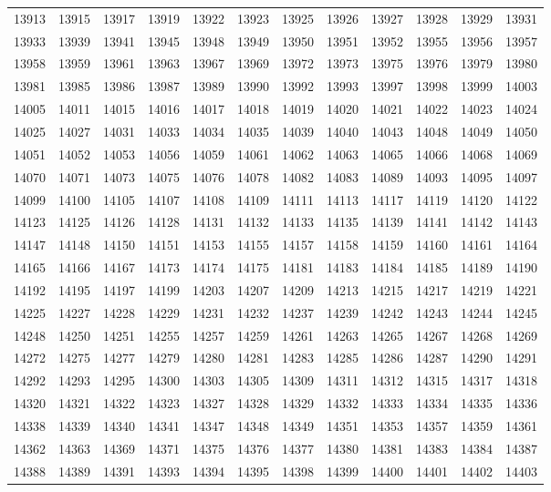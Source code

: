 \begin{center}
\begin{longtable}{llllllllllll}
13913 &13915 &13917 &13919 &13922 &13923 &13925 &13926 &13927 &13928 &13929 &13931 \\
13933 &13939 &13941 &13945 &13948 &13949 &13950 &13951 &13952 &13955 &13956 &13957 \\
13958 &13959 &13961 &13963 &13967 &13969 &13972 &13973 &13975 &13976 &13979 &13980 \\
13981 &13985 &13986 &13987 &13989 &13990 &13992 &13993 &13997 &13998 &13999 &14003 \\
14005 &14011 &14015 &14016 &14017 &14018 &14019 &14020 &14021 &14022 &14023 &14024 \\
14025 &14027 &14031 &14033 &14034 &14035 &14039 &14040 &14043 &14048 &14049 &14050 \\
14051 &14052 &14053 &14056 &14059 &14061 &14062 &14063 &14065 &14066 &14068 &14069 \\
14070 &14071 &14073 &14075 &14076 &14078 &14082 &14083 &14089 &14093 &14095 &14097 \\
14099 &14100 &14105 &14107 &14108 &14109 &14111 &14113 &14117 &14119 &14120 &14122 \\
14123 &14125 &14126 &14128 &14131 &14132 &14133 &14135 &14139 &14141 &14142 &14143 \\
14147 &14148 &14150 &14151 &14153 &14155 &14157 &14158 &14159 &14160 &14161 &14164 \\
14165 &14166 &14167 &14173 &14174 &14175 &14181 &14183 &14184 &14185 &14189 &14190 \\
14192 &14195 &14197 &14199 &14203 &14207 &14209 &14213 &14215 &14217 &14219 &14221 \\
14225 &14227 &14228 &14229 &14231 &14232 &14237 &14239 &14242 &14243 &14244 &14245 \\
14248 &14250 &14251 &14255 &14257 &14259 &14261 &14263 &14265 &14267 &14268 &14269 \\
14272 &14275 &14277 &14279 &14280 &14281 &14283 &14285 &14286 &14287 &14290 &14291 \\
14292 &14293 &14295 &14300 &14303 &14305 &14309 &14311 &14312 &14315 &14317 &14318 \\
14320 &14321 &14322 &14323 &14327 &14328 &14329 &14332 &14333 &14334 &14335 &14336 \\
14338 &14339 &14340 &14341 &14347 &14348 &14349 &14351 &14353 &14357 &14359 &14361 \\
14362 &14363 &14369 &14371 &14375 &14376 &14377 &14380 &14381 &14383 &14384 &14387 \\
14388 &14389 &14391 &14393 &14394 &14395 &14398 &14399 &14400 &14401 &14402 &14403 \\

\end{longtable}
\end{center}

